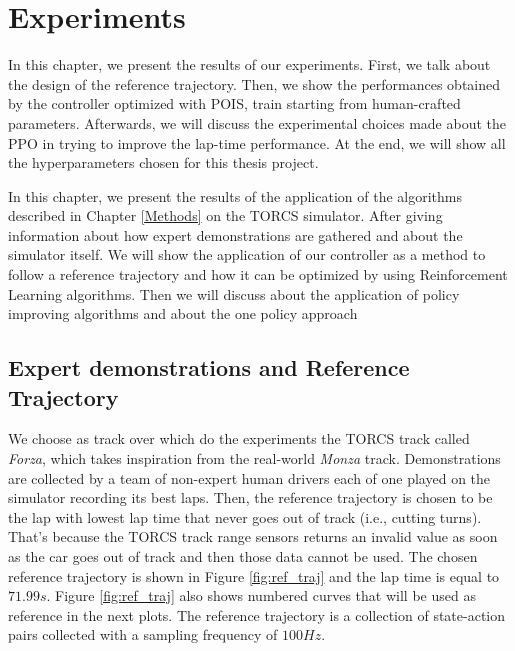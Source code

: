 \chapter{Experiments}
\label{Experiments}
\thispagestyle{empty}
In this chapter, we present the results of our experiments. 
First, we talk about the design of the reference trajectory.
Then, we show the performances obtained by the controller optimized with POIS, train starting from human-crafted parameters. Afterwards, we will discuss the experimental choices made about the PPO in trying to improve the lap-time performance.
At the end, we will show all the hyperparameters chosen for this thesis project.


In this chapter, we present the results of the application of the algorithms described in Chapter \ref{Methods} on the TORCS simulator. After giving information about how expert demonstrations are gathered and about the simulator itself.
We will show the application of our controller as a method to follow a reference trajectory and how it can be optimized by using Reinforcement Learning algorithms. Then we will discuss about the application of policy improving
algorithms and about the one policy approach

\section{Expert demonstrations and Reference Trajectory}

We choose as track over which do the experiments the TORCS track called \textit{Forza}, which takes inspiration from the real-world \textit{Monza} track. Demonstrations are collected by a team of non-expert human drivers each of one
played on the simulator recording its best laps. Then, the reference trajectory is chosen to be the lap with lowest lap time that never goes out of track (i.e., cutting turns). That's because the TORCS track range sensors returns
an invalid value as soon as the car goes out of track and then those data cannot be used. The chosen reference trajectory is shown in Figure \ref{fig:ref_traj} and the lap time is equal to $71.99s$. Figure \ref{fig:ref_traj} also shows numbered curves
that will be used as reference in the next plots.
The reference trajectory is a collection of state-action pairs collected with a sampling frequency of $100Hz.$


